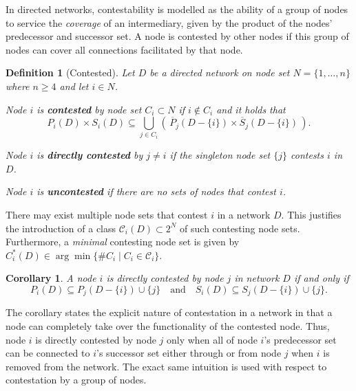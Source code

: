 \documentclass[11pt,fleqn]{article}
\newcounter{llst}
\newenvironment{abet}{\begin{list}{\rm (\alph{llst})}{\usecounter{llst}
\setlength{\itemindent}{0em} \setlength{\leftmargin}{3em}
\setlength{\labelwidth}{2em} \setlength{\labelsep}{1em}}}{\end{list}}
\newtheorem{corollary}[theorem]{Corollary}
\newtheorem{definition}[theorem]{Definition}
\begin{document}
In directed networks, contestability is modelled as the ability of a group of nodes to service the \emph{coverage} of an intermediary, given by the product of the nodes' predecessor and successor set. A node is contested by other nodes if this group of nodes can cover all connections facilitated by that node.

\begin{definition}[Contested] \label{Contested}
Let $D$ be a directed network on node set $N=\{1, \ldots ,n\}$ where $n \geqslant 4$ and let $i \in N$.
\begin{abet}
\item Node $i$ is \textbf{contested} by node set $C_{i} \subset N$ if $i \notin C_i$ and it holds that
\begin{equation} \label{Group Contested}
P_{i}(D) \times S_{i}(D) \subseteq \bigcup_{j \in C_{i}} \left( \, \overline{P}_{j}(D - \{i\}) \times \overline{S}_{j}(D - \{i\}) \, \right).
\end{equation}

\item Node $i$ is \textbf{directly contested} by $j \neq i$ if the singleton node set $\{ j \}$ contests $i$ in $D$.

\item Node $i$ is \textbf{uncontested} if there are no sets of nodes that contest $i$.
\end{abet}
\end{definition}

There may exist multiple node sets that contest $i$ in a network $D$. This justifies the introduction of a class $\mathcal{C}_i (D) \subset 2^N$ of such contesting node sets. Furthermore, a \emph{minimal} contesting node set is given by $C_{i}^{*}(D) \in \arg \min \{ \#C_{i} \mid C_{i} \in \mathcal{C}_{i} \}$.

\begin{corollary}
A node $i$ is directly contested by node $j$ in network $D$ if and only if\begin{equation} \label{Directly Contested}
P_{i}(D) \subseteq P_{j} (D - \{i\}) \cup \{j\} \quad \mbox{and} \quad S_{i} (D) \subseteq S_{j} (D - \{i\}) \cup \{j\}.
\end{equation}
\end{corollary}

The corollary states the explicit nature of contestation in a network in that a node can completely take over the functionality of the contested node. Thus, node $i$ is directly contested by node $j$ only when all of node $i$'s predecessor set can be connected to $i$'s successor set either through or from node $j$ when $i$ is removed from the network. The exact same intuition is used with respect to contestation by a group of nodes.
\end{document}
